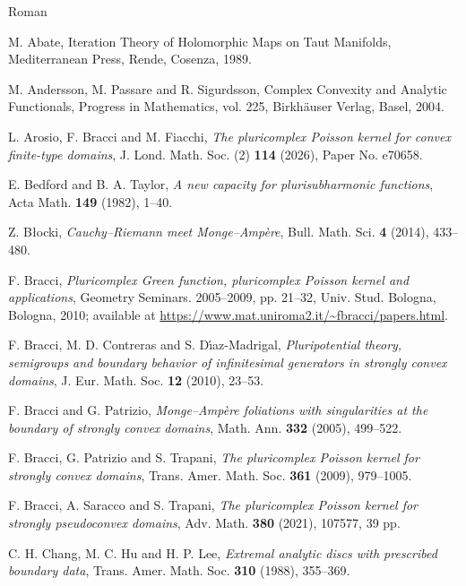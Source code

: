 \documentclass[12pt,a4paper]{amsart}
\numberwithin{equation}{section}
\theoremstyle{definition}
\begin{document}
\bigskip

\begin{thebibliography}{\;\;\; Roman}

 M. Abate,  Iteration Theory of Holomorphic  Maps on Taut Manifolds, Mediterranean Press, Rende, Cosenza, 1989.

 M. Andersson, M. Passare and R. Sigurdsson, Complex Convexity and Analytic Functionals, Progress in Mathematics, vol. 225, Birkh\"auser Verlag, Basel, 2004.

 L. Arosio, F. Bracci and  M. Fiacchi, {\it The pluricomplex Poisson kernel for convex finite-type domains}, J. Lond. Math. Soc. (2) {\bf 114} (2026),  Paper No. e70658.

 E. Bedford and B. A. Taylor, {\it A new capacity for plurisubharmonic functions}, Acta Math. {\bf 149} (1982), 1--40.

 Z. B{\l}ocki, {\it Cauchy--Riemann meet Monge--Amp\`{e}re}, Bull. Math. Sci. {\bf 4} (2014), 433--480.


 F. Bracci,  {\it Pluricomplex Green function, pluricomplex Poisson kernel and applications}, Geometry Seminars. 2005--2009, pp. 21--32, Univ. Stud. Bologna, Bologna, 2010; available  at \url{https://www.mat.uniroma2.it/~fbracci/papers.html}.

 F. Bracci, M. D. Contreras and S. D\'{\i}az-Madrigal, {\it Pluripotential theory, semigroups and boundary behavior of infinitesimal generators in strongly convex domains}, J. Eur. Math. Soc. {\bf 12} (2010), 23--53.

 F. Bracci and G. Patrizio, {\it Monge--Amp\`{e}re foliations with singularities at the boundary of strongly convex domains},  Math. Ann. {\bf 332} (2005), 499--522.

 F. Bracci,  G. Patrizio and S. Trapani, {\it The pluricomplex Poisson kernel for strongly convex domains},  Trans. Amer. Math. Soc. {\bf 361} (2009), 979--1005.

 F. Bracci, A. Saracco and S. Trapani, {\it The pluricomplex Poisson kernel for strongly pseudoconvex domains},  Adv. Math. {\bf 380} (2021), 107577, 39 pp.


 C. H. Chang, M. C. Hu and H. P. Lee, {\it Extremal analytic discs with prescribed boundary data}, Trans. Amer. Math. Soc. {\bf 310} (1988), 355--369.




\end{thebibliography}
\end{document}
